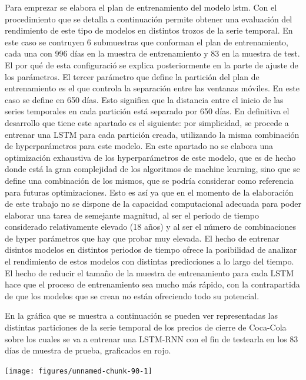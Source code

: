 \documentclass[]{DissertateUSU}
\begin{document}
\noindent Para emprezar se elabora el plan de entrenamiento del modelo
lstm. Con el procedimiento que se detalla a continuación permite obtener
una evaluación del rendimiento de este tipo de modelos en distintos
trozos de la serie temporal. En este caso se contruyen 6 submuestras que
conforman el plan de entrenamiento, cada una con 996 días en la muestra
de entrenamiento y 83 en la muestra de test. El por qué de esta
configuració se explica posteriormente en la parte de ajuste de los
parámetros. El tercer parámetro que define la partición del plan de
entrenamiento es el que controla la separación entre las ventanas
móviles. En este caso se define en 650 días. Esto significa que la
distancia entre el inicio de las series temporales en cada partición
está separado por 650 días. En definitiva el desarrollo que tiene este
apartado es el siguiente: por simplicidad, se procede a entrenar una
LSTM para cada partición creada, utilizando la misma combinación de
hyperparámetros para este modelo. En este apartado no se elabora una
optimización exhaustiva de los hyperparámetros de este modelo, que es de
hecho donde está la gran complejidad de los algoritmos de machine
learning, sino que se define una combinación de los mismos, que se
podría considerar como referencia para futuras optimizaciones. Esto es
así ya que en el momento de la elaboración de este trabajo no se dispone
de la capacidad computacional adecuada para poder elaborar una tarea de
semejante magnitud, al ser el periodo de tiempo considerado
relativamente elevado (18 años) y al ser el número de combinaciones de
hyper parámetros que hay que probar muy elevada. El hecho de entrenar
disintos modelos en distintos periodos de tiempo ofrece la posibilidad
de analizar el rendimiento de estos modelos con distintas predicciones a
lo largo del tiempo. El hecho de reducir el tamaño de la muestra de
entrenamiento para cada LSTM hace que el proceso de entrenamiento sea
mucho más rápido, con la contrapartida de que los modelos que se crean
no están ofreciendo todo su potencial.

\justifying

\noindent En la gráfica que se muestra a continuación se pueden ver
representadas las distintas particiones de la serie temporal de los
precios de cierre de Coca-Cola sobre los cuales se va a entrenar una
LSTM-RNN con el fin de testearla en los 83 días de muestra de prueba,
graficados en rojo.

\centering

\justifying

\begin{center}\texttt{[image: figures/unnamed-chunk-90-1]} \end{center}
\centering
\end{document}
